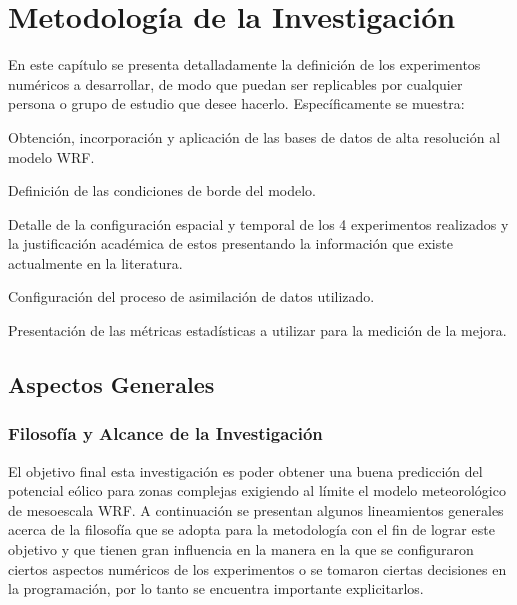\chapter{Metodología de la Investigación}
En este capítulo se presenta detalladamente la definición de los experimentos numéricos a desarrollar, de modo que puedan ser replicables por cualquier persona o grupo de estudio que desee hacerlo. Específicamente se muestra: 
\begin{itemize*}
	\item Obtención, incorporación y aplicación de las bases de datos de alta resolución al modelo WRF.
	\item Definición de las condiciones de borde del modelo.
	\item Detalle de la configuración espacial y temporal de los 4 experimentos realizados y la justificación académica de estos presentando la información que existe actualmente en la literatura.
	\item Configuración del proceso de asimilación de datos utilizado.
	\item Presentación de las métricas estadísticas a utilizar para la medición de la mejora.
\end{itemize*}
\section{Aspectos Generales}
\subsection{Filosofía y Alcance de la Investigación}
El objetivo final esta investigación es poder obtener una buena predicción del potencial eólico para zonas complejas exigiendo al límite el modelo meteorológico de mesoescala WRF. 
A continuación se presentan algunos lineamientos generales acerca de la filosofía que se adopta para la metodología con el fin de lograr este objetivo y que tienen gran influencia en la manera en la que se configuraron ciertos aspectos numéricos de los experimentos o se tomaron ciertas decisiones en la programación, por lo tanto se encuentra importante explicitarlos.
